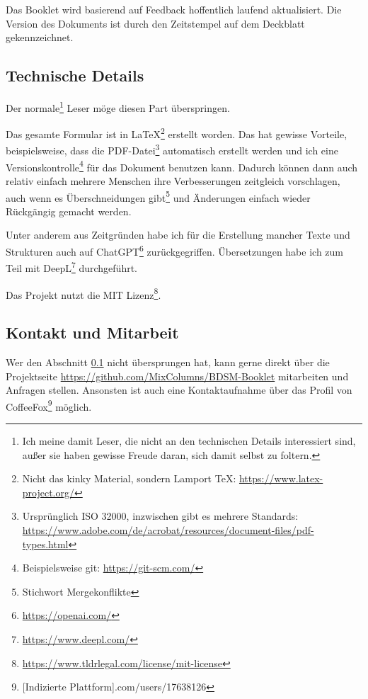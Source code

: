 \documentclass[a4paper,12pt]{article}
\begin{document}
Das Booklet wird basierend auf Feedback hoffentlich\textsuperscript{\texttrademark} laufend aktualisiert. Die Version des Dokuments ist durch den Zeitstempel auf dem Deckblatt gekennzeichnet.

\newpage

\subsection{Technische Details}\label{Technische_Details}
Der \glqq normale\grqq\footnote{Ich meine damit Leser, die nicht an den technischen Details interessiert sind, außer sie haben gewisse Freude daran, sich damit selbst zu foltern.} Leser möge diesen Part überspringen.

Das gesamte Formular ist in \LaTeX\footnote{Nicht das kinky Material, sondern Lamport TeX: \url{https://www.latex-project.org/}} erstellt worden. Das hat gewisse Vorteile, beispielsweise, dass die PDF-Datei\footnote{Ursprünglich ISO 32000, inzwischen gibt es mehrere Standards: \url{https://www.adobe.com/de/acrobat/resources/document-files/pdf-types.html}} automatisch erstellt werden und ich eine Versionskontrolle\footnote{Beispielsweise git: \url{https://git-scm.com/}} für das Dokument benutzen kann. Dadurch können dann auch relativ einfach mehrere Menschen ihre Verbesserungen zeitgleich vorschlagen, auch wenn es Überschneidungen gibt\footnote{Stichwort Mergekonflikte} und Änderungen einfach wieder Rückgängig gemacht werden.

Unter anderem aus Zeitgründen habe ich für die Erstellung mancher Texte und Strukturen auch auf ChatGPT\footnote{\url{https://openai.com/}} zurückgegriffen. Übersetzungen habe ich zum Teil mit DeepL\footnote{\url{https://www.deepl.com/}} durchgeführt.

Das Projekt nutzt die MIT Lizenz\footnote{\url{https://www.tldrlegal.com/license/mit-license}}.

\subsection{Kontakt und Mitarbeit}
Wer den Abschnitt \ref{Technische_Details} nicht übersprungen hat, kann gerne direkt über die Projektseite \url{https://github.com/MixColumns/BDSM-Booklet} mitarbeiten und Anfragen stellen. Ansonsten ist auch eine Kontaktaufnahme über das Profil von CoffeeFox\footnote{[Indizierte Plattform].com/users/17638126} möglich.


\newpage
\end{document}

